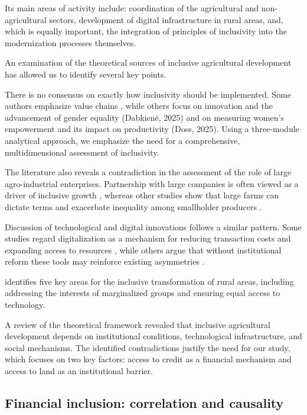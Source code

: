 \documentclass[pdflatex,sn-mathphys-ay]{sn-jnl}
\begin{document}
Its main areas of activity include: coordination of the agricultural and
non-agricultural sectors, development of digital infrastructure in rural
areas, and, which is equally important, the integration of principles of
inclusivity into the modernization processes themselves.

An examination of the theoretical sources of inclusive agricultural
development has allowed us to identify several key points.

There is no consensus on exactly how inclusivity should be implemented.
Some authors emphasize value chains \citep{ref81}, while
others focus on innovation and the advancement of gender equality
(Dabkienė, 2025) and on measuring women's empowerment and its impact on
productivity (Doss, 2025). Using a three-module analytical approach, we
emphasize the need for a comprehensive, multidimensional assessment of
inclusivity.

The literature also reveals a contradiction in the assessment of the
role of large agro-industrial enterprises. Partnership with large
companies is often viewed as a driver of inclusive growth
\citep{ref34}, whereas other studies show that large farms can dictate
terms and exacerbate inequality among smallholder producers
\citep{ref90}.

Discussion of technological and digital innovations follows a similar
pattern. Some studies regard digitalization as a mechanism for reducing
transaction costs and expanding access to resources \citep{ref105,ref72,ref43,ref37,ref104},
while others argue that without institutional reform these tools may
reinforce existing asymmetries \citep{ref28}.

\citet{ref55} identifies five key areas for the inclusive
transformation of rural areas, including addressing the interests of
marginalized groups and ensuring equal access to technology.

A review of the theoretical framework revealed that inclusive
agricultural development depends on institutional conditions,
technological infrastructure, and social mechanisms. The identified
contradictions justify the need for our study, which focuses on two key
factors: access to credit as a financial mechanism and access to land as
an institutional barrier.

\subsection{Financial inclusion: correlation and causality}
\end{document}
